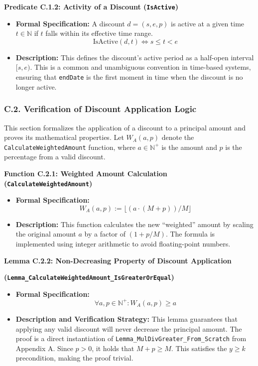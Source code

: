 \documentclass[
  english,
  onecolumn]{article}
\providecommand{\tightlist}{%
  \setlength{\itemsep}{0pt}\setlength{\parskip}{0pt}}
\begin{document}
\textbf{Predicate C.1.2: Activity of a Discount (\texttt{IsActive})}

\begin{itemize}
\tightlist
\item
  \textbf{Formal Specification:} A discount \(d = (s, e, p)\) is active
  at a given time \(t \in \mathbb{N}\) if \(t\) falls within its
  effective time range. \[ \text{IsActive}(d, t) \iff s \le t < e \]
\item
  \textbf{Description:} This defines the discount's active period as a
  half-open interval \([s, e)\). This is a common and unambiguous
  convention in time-based systems, ensuring that \texttt{endDate} is
  the first moment in time when the discount is no longer active.
\end{itemize}

\subsubsection{C.2. Verification of Discount Application
Logic}\label{c.2.-verification-of-discount-application-logic}

This section formalizes the application of a discount to a principal
amount and proves its mathematical properties. Let \(W_A(a, p)\) denote
the \texttt{CalculateWeightedAmount} function, where
\(a \in \mathbb{N}^+\) is the amount and \(p\) is the percentage from a
valid discount.

\textbf{Function C.2.1: Weighted Amount Calculation
(\texttt{CalculateWeightedAmount})}

\begin{itemize}
\tightlist
\item
  \textbf{Formal Specification:}
  \[ W_A(a, p) := \lfloor (a \cdot (M + p)) / M \rfloor \]
\item
  \textbf{Description:} This function calculates the new ``weighted''
  amount by scaling the original amount \(a\) by a factor of
  \((1 + p/M)\). The formula is implemented using integer arithmetic to
  avoid floating-point numbers.
\end{itemize}

\textbf{Lemma C.2.2: Non-Decreasing Property of Discount Application}

\textbf{(\texttt{Lemma\_CalculateWeightedAmount\_IsGreaterOrEqual})}

\begin{itemize}
\tightlist
\item
  \textbf{Formal Specification:}
  \[ \forall a, p \in \mathbb{N}^+ : W_A(a, p) \ge a \]
\item
  \textbf{Description and Verification Strategy:} This lemma guarantees
  that applying any valid discount will never decrease the principal
  amount. The proof is a direct instantiation of
  \texttt{Lemma\_MulDivGreater\_From\_Scratch} from Appendix A. Since
  \(p > 0\), it holds that \(M + p \ge M\). This satisfies the
  \(y \ge k\) precondition, making the proof trivial.
\end{itemize}
\end{document}

